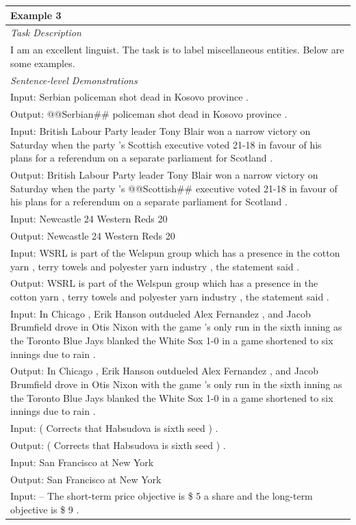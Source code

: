 \documentclass[11pt]{article}
\begin{document}
\begin{table}[th!]
{\begin{tabular}{l}
\textbf{Example 3} \\\midrule
       	\textit{Task Description} \\
I am an excellent linguist. The task is to label miscellaneous entities. Below are some examples. \\\midrule
\textit{Sentence-level Demonstrations} \\
Input: Serbian policeman shot dead in Kosovo province . \\
Output: @@Serbian\#\# policeman shot dead in Kosovo province . \\
Input: British Labour Party leader Tony Blair won a narrow victory on Saturday when the party 's Scottish executive voted 21-18 in favour of his plans for a referendum on a separate parliament for Scotland . \\
Output: British Labour Party leader Tony Blair won a narrow victory on Saturday when the party 's @@Scottish\#\# executive voted 21-18 in favour of his plans for a referendum on a separate parliament for Scotland . \\
Input: Newcastle 24 Western Reds 20 \\
Output: Newcastle 24 Western Reds 20 \\
Input: WSRL is part of the Welspun group which has a presence in the cotton yarn , terry towels and polyester yarn industry , the statement said . \\
Output: WSRL is part of the Welspun group which has a presence in the cotton yarn , terry towels and polyester yarn industry , the statement said . \\
Input: In Chicago , Erik Hanson outdueled Alex Fernandez , and Jacob Brumfield drove in Otis Nixon with the game 's only run in the sixth inning as the Toronto Blue Jays blanked the White Sox 1-0 in a game shortened to six innings due to rain . \\
Output: In Chicago , Erik Hanson outdueled Alex Fernandez , and Jacob Brumfield drove in Otis Nixon with the game 's only run in the sixth inning as the Toronto Blue Jays blanked the White Sox 1-0 in a game shortened to six innings due to rain . \\
Input: ( Corrects that Habsudova is sixth seed ) . \\
Output: ( Corrects that Habsudova is sixth seed ) . \\
Input: San Francisco at New York \\
Output: San Francisco at New York \\
Input: -- The short-term price objective is \$ 5 a share and the long-term objective is \$ 9 . \\

\end{tabular}}
\end{table}
\end{document}
